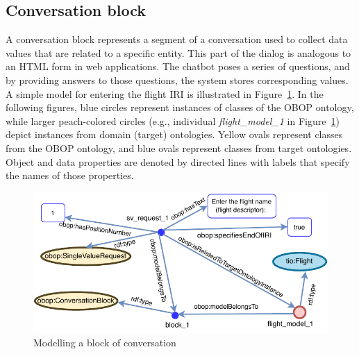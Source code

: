 \documentclass[runningheads]{llncs}
\begin{document}
\subsection{Conversation block}
A conversation block represents a segment of a conversation used to collect data values that are related to a specific entity. This part of the dialog is analogous to an HTML form in web applications. The chatbot poses a series of questions, and by providing answers to those questions, the system stores corresponding values. A simple model for entering the flight IRI is illustrated in Figure~\ref{fig:conv_block}. In the following figures, blue circles represent instances of classes of the OBOP ontology, while larger peach-colored circles (e.g., individual \textit{flight\_model\_1} in Figure~\ref{fig:conv_block}) depict instances from domain (target) ontologies. Yellow ovals represent classes from the OBOP ontology, and blue ovals represent classes from target ontologies. Object and data properties are denoted by directed lines with labels that specify the names of those properties.     

\begin{figure}[H]
  \centering
  \includegraphics[width=\linewidth]{img/conversation_block}
  \caption{Modelling a block of conversation}
  \label{fig:conv_block}
\end{figure}
\end{document}
